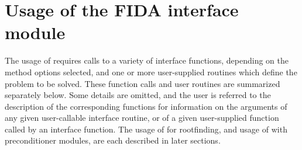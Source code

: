 \section{Usage of the FIDA interface module}\label{ss:fida_usage}

The usage of {\fida} requires calls to a variety of interface
functions, depending on the method options selected, and one or more
user-supplied routines which define the problem to be solved.  These
function calls and user routines are summarized separately below.
Some details are omitted, and the user is referred to the description
of the corresponding {\ida} functions for information on the arguments 
of any given user-callable interface routine, or of a given user-supplied 
function called by an interface function.
The usage of {\fida} for rootfinding, and usage of {\fida} with
preconditioner modules, are each described in later sections.

